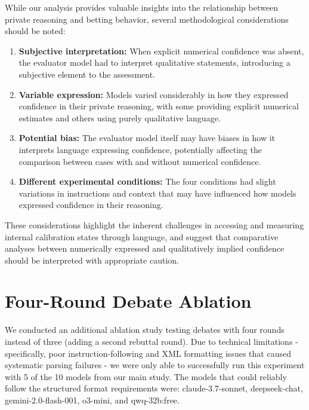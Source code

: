 \documentclass{article}
\begin{document}
While our analysis provides valuable insights into the relationship between private reasoning and betting behavior, several methodological considerations should be noted:

\begin{enumerate}
   \item \textbf{Subjective interpretation:} When explicit numerical confidence was absent, the evaluator model had to interpret qualitative statements, introducing a subjective element to the assessment.

   \item \textbf{Variable expression:} Models varied considerably in how they expressed confidence in their private reasoning, with some providing explicit numerical estimates and others using purely qualitative language.

   \item \textbf{Potential bias:} The evaluator model itself may have biases in how it interprets language expressing confidence, potentially affecting the comparison between cases with and without numerical confidence.

   \item \textbf{Different experimental conditions:} The four conditions had slight variations in instructions and context that may have influenced how models expressed confidence in their reasoning.
\end{enumerate}

These considerations highlight the inherent challenges in accessing and measuring internal calibration states through language, and suggest that comparative analyses between numerically expressed and qualitatively implied confidence should be interpreted with appropriate caution.

\section{Four-Round Debate Ablation}
\label{appendix:four_round}

We conducted an additional ablation study testing debates with four rounds instead of three (adding a second rebuttal round). Due to technical limitations - specifically, poor instruction-following and XML formatting issues that caused systematic parsing failures - we were only able to successfully run this experiment with 5 of the 10 models from our main study. The models that could reliably follow the structured format requirements were: claude-3.7-sonnet, deepseek-chat, gemini-2.0-flash-001, o3-mini, and qwq-32b:free.
\end{document}
